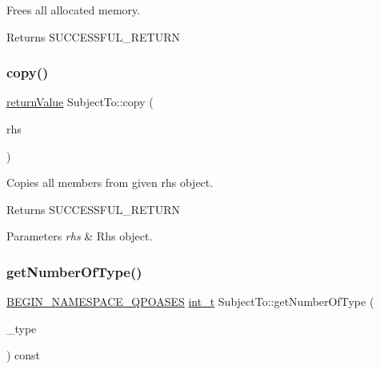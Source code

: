 Frees all allocated memory. \begin{DoxyReturn}{Returns}
S\+U\+C\+C\+E\+S\+S\+F\+U\+L\+\_\+\+R\+E\+T\+U\+RN 
\end{DoxyReturn}
\mbox{\label{class_subject_to_a996c9fba06e918ded5cdc87eaffc3a6b}} 
\subsubsection{\texorpdfstring{copy()}{copy()}}
{\footnotesize\ttfamily \hyperlink{_message_handling_8hpp_a81d556f613bfbabd0b1f9488c0fa865e}{return\+Value} Subject\+To\+::copy (\begin{DoxyParamCaption}\item[{const \hyperlink{class_subject_to}{Subject\+To} \&}]{rhs }\end{DoxyParamCaption})\hspace{0.3cm}{\ttfamily [protected]}}

Copies all members from given rhs object. \begin{DoxyReturn}{Returns}
S\+U\+C\+C\+E\+S\+S\+F\+U\+L\+\_\+\+R\+E\+T\+U\+RN 
\end{DoxyReturn}

\begin{DoxyParams}{Parameters}
{\em rhs} & Rhs object. \\
\hline
\end{DoxyParams}
\mbox{\label{class_subject_to_a1db9591577b6a9fd403086b832cc4d2a}} 
\subsubsection{\texorpdfstring{get\+Number\+Of\+Type()}{getNumberOfType()}}
{\footnotesize\ttfamily \hyperlink{_types_8hpp_afd127fcb3c8f47975e9fa0ec2bacde52}{B\+E\+G\+I\+N\+\_\+\+N\+A\+M\+E\+S\+P\+A\+C\+E\+\_\+\+Q\+P\+O\+A\+S\+ES} \hyperlink{_types_8hpp_ab6fd6105e64ed14a0c9281326f05e623}{int\+\_\+t} Subject\+To\+::get\+Number\+Of\+Type (\begin{DoxyParamCaption}\item[{\hyperlink{_types_8hpp_a3e65c061dde41562d1aeb2c4453bf1d3}{Subject\+To\+Type}}]{\+\_\+type }\end{DoxyParamCaption}) const\hspace{0.3cm}{\ttfamily [inline]}}

